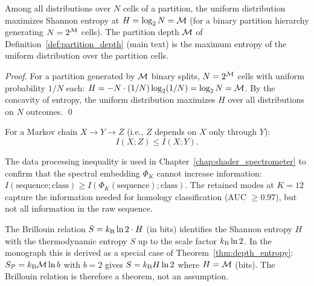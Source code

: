 \begin{proposition}
\label{prop:max_entropy}
Among all distributions over $N$ cells of a partition, the uniform distribution
maximizes Shannon entropy at $H = \log_2 N = \mathcal{M}$ (for a binary partition
hierarchy generating $N = 2^{\mathcal{M}}$ cells). The partition depth $\mathcal{M}$ of
Definition~\ref{def:partition_depth} (main text) is the maximum entropy
of the uniform distribution over the partition cells.
\end{proposition}

\begin{proof}
For a partition generated by $\mathcal{M}$ binary splits, $N = 2^{\mathcal{M}}$ cells
with uniform probability $1/N$ each: $H = -N \cdot (1/N)\log_2(1/N) = \log_2 N = \mathcal{M}$.
By the concavity of entropy, the uniform distribution maximizes $H$ over all
distributions on $N$ outcomes. \qed
\end{proof}

\begin{theorem}
For a Markov chain $X \to Y \to Z$ (i.e., $Z$ depends on $X$ only through $Y$):
\begin{equation}
  I(X; Z) \leq I(X; Y).
\end{equation}
\end{theorem}

The data processing inequality is used in Chapter~\ref{chap:shader_spectrometer}
to confirm that the spectral embedding $\Phi_K$ cannot increase information:
$I(\text{sequence}; \text{class}) \geq I(\Phi_K(\text{sequence}); \text{class})$.
The retained modes at $K=12$ capture the information needed for homology
classification (AUC $\geq 0.97$), but not all information in the raw sequence.

\begin{remark}
The Brillouin relation $S = k_{\mathrm{B}} \ln 2 \cdot H$ (in bits) identifies the Shannon
entropy $H$ with the thermodynamic entropy $S$ up to the scale factor $k_{\mathrm{B}} \ln 2$.
In the monograph this is derived as a special case of Theorem~\ref{thm:depth_entropy}:
$S_{\mathcal{P}} = k_{\mathrm{B}} \mathcal{M} \ln b$ with $b = 2$ gives $S = k_{\mathrm{B}} H \ln 2$ where
$H = \mathcal{M}$ (bits). The Brillouin relation is therefore a theorem, not an assumption.
\end{remark}
